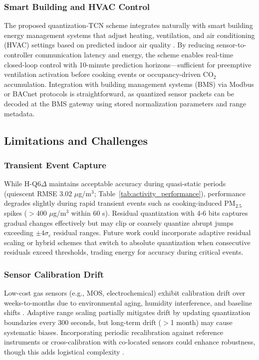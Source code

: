 \subsubsection{Smart Building and HVAC Control}

The proposed quantization-TCN scheme integrates naturally with smart building energy management systems that adjust heating, ventilation, and air conditioning (HVAC) settings based on predicted indoor air quality \cite{quang2025ai}. By reducing sensor-to-controller communication latency and energy, the scheme enables real-time closed-loop control with 10-minute prediction horizons—sufficient for preemptive ventilation activation before cooking events or occupancy-driven CO$_2$ accumulation. Integration with building management systems (BMS) via Modbus or BACnet protocols is straightforward, as quantized sensor packets can be decoded at the BMS gateway using stored normalization parameters and range metadata.

\subsection{Limitations and Challenges}

\subsubsection{Transient Event Capture}

While H-Q6$\Delta$ maintains acceptable accuracy during quasi-static periods (quiescent RMSE 3.02 $\mu$g/m$^3$; Table~\ref{tab:activity_performance}), performance degrades slightly during rapid transient events such as cooking-induced PM$_{2.5}$ spikes ($>$400 $\mu$g/m$^3$ within 60 s). Residual quantization with 4-6 bits captures gradual changes effectively but may clip or coarsely quantize abrupt jumps exceeding $\pm 4\sigma_c$ residual ranges. Future work could incorporate adaptive residual scaling or hybrid schemes that switch to absolute quantization when consecutive residuals exceed thresholds, trading energy for accuracy during critical events.

\subsubsection{Sensor Calibration Drift}

Low-cost gas sensors (e.g., MOS, electrochemical) exhibit calibration drift over weeks-to-months due to environmental aging, humidity interference, and baseline shifts \cite{kim2025machine}. Adaptive range scaling partially mitigates drift by updating quantization boundaries every 300 seconds, but long-term drift ($>$1 month) may cause systematic biases. Incorporating periodic recalibration against reference instruments or cross-calibration with co-located sensors could enhance robustness, though this adds logistical complexity \cite{wang2025indoor}.

